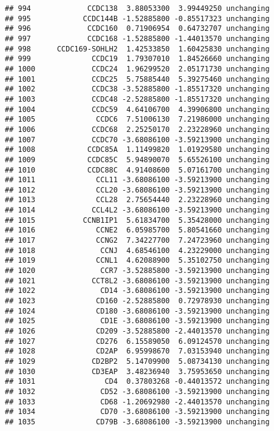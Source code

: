 \documentclass[]{article}
\begin{document}
\begin{verbatim}
## 994             CCDC138  3.88053300  3.99449250 unchanging
## 995            CCDC144B -1.52885800 -0.85517323 unchanging
## 996             CCDC160  0.71906954  0.64732707 unchanging
## 997             CCDC168 -1.52885800 -1.44013570 unchanging
## 998      CCDC169-SOHLH2  1.42533850  1.60425830 unchanging
## 999              CCDC19  1.79307010  1.84526660 unchanging
## 1000             CCDC24  1.96299520  2.05171730 unchanging
## 1001             CCDC25  5.75885440  5.39275460 unchanging
## 1002             CCDC38 -3.52885800 -1.85517320 unchanging
## 1003             CCDC48 -2.52885800 -1.85517320 unchanging
## 1004             CCDC59  4.64106700  4.39906800 unchanging
## 1005              CCDC6  7.51006130  7.21986000 unchanging
## 1006             CCDC68  2.25250170  2.23228960 unchanging
## 1007             CCDC70 -3.68086100 -3.59213900 unchanging
## 1008            CCDC85A  1.11499820  1.01929580 unchanging
## 1009            CCDC85C  5.94890070  5.65526100 unchanging
## 1010            CCDC88C  4.91408600  5.07161700 unchanging
## 1011              CCL11 -3.68086100 -3.59213900 unchanging
## 1012              CCL20 -3.68086100 -3.59213900 unchanging
## 1013              CCL28  2.75654440  2.23228960 unchanging
## 1014             CCL4L2 -3.68086100 -3.59213900 unchanging
## 1015           CCNB1IP1  5.61834700  5.35428000 unchanging
## 1016              CCNE2  6.05985700  5.80541660 unchanging
## 1017              CCNG2  7.34227700  7.24723960 unchanging
## 1018               CCNJ  4.68546100  4.23229000 unchanging
## 1019              CCNL1  4.62088900  5.35102750 unchanging
## 1020               CCR7 -3.52885800 -3.59213900 unchanging
## 1021             CCT8L2 -3.68086100 -3.59213900 unchanging
## 1022               CD14 -3.68086100 -3.59213900 unchanging
## 1023              CD160 -2.52885800  0.72978930 unchanging
## 1024              CD180 -3.68086100 -3.59213900 unchanging
## 1025               CD1E -3.68086100 -3.59213900 unchanging
## 1026              CD209 -3.52885800 -2.44013570 unchanging
## 1027              CD276  6.15589050  6.09124570 unchanging
## 1028              CD2AP  6.95998670  7.03153940 unchanging
## 1029             CD2BP2  5.14709900  5.08734130 unchanging
## 1030             CD3EAP  3.48236940  3.75953650 unchanging
## 1031                CD4  0.37803268 -0.44013572 unchanging
## 1032               CD52 -3.68086100 -3.59213900 unchanging
## 1033               CD68 -1.20692980 -2.44013570 unchanging
## 1034               CD70 -3.68086100 -3.59213900 unchanging
## 1035              CD79B -3.68086100 -3.59213900 unchanging

\end{verbatim}
\end{document}
